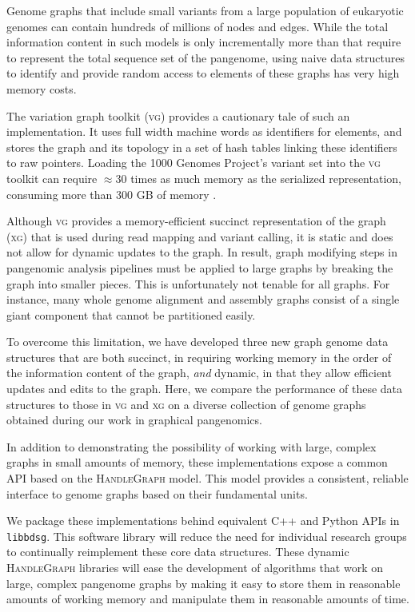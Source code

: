 \documentclass{article}
\begin{document}
Genome graphs that include small variants from a large population of eukaryotic genomes can contain hundreds of millions of nodes and edges.
While the total information content in such models is only incrementally more than that require to represent the total sequence set of the pangenome, using naive data structures to identify and provide random access to elements of these graphs has very high memory costs.

The variation graph toolkit (\textsc{vg}) \cite{Garrison_2018} provides a cautionary tale of such an implementation.
It uses full width machine words as identifiers for elements, and stores the graph and its topology in a set of hash tables linking these identifiers to raw pointers.
Loading the 1000 Genomes Project's variant set into the \textsc{vg} toolkit can require $\approx$30 times as much memory as the serialized representation, consuming more than 300 GB of memory \cite{Garrison_2019}.

Although \textsc{vg} provides a memory-efficient succinct representation of the graph (\textsc{xg}) that is used during read mapping and variant calling, it is static and does not allow for dynamic updates to the graph.
In result, graph modifying steps in pangenomic analysis pipelines must be applied to large graphs by breaking the graph into smaller pieces.
This is unfortunately not tenable for all graphs.
For instance, many whole genome alignment and assembly graphs consist of a single giant component that cannot be partitioned easily.

To overcome this limitation, we have developed three new graph genome data structures that are both succinct, in requiring working memory in the order of the information content of the graph, \emph{and} dynamic, in that they allow efficient updates and edits to the graph.
Here, we compare the performance of these data structures to those in \textsc{vg} and \textsc{xg} on a diverse collection of genome graphs obtained during our work in graphical pangenomics.

In addition to demonstrating the possibility of working with large, complex graphs in small amounts of memory, these implementations expose a common API based on the \textsc{HandleGraph} model.
This model provides a consistent, reliable interface to genome graphs based on their fundamental units.

We package these implementations behind equivalent C++ and Python APIs in \texttt{libbdsg}.
This software library will reduce the need for individual research groups to continually reimplement these core data structures.
These dynamic \textsc{HandleGraph} libraries will ease the development of algorithms that work on large, complex pangenome graphs by making it easy to store them in reasonable amounts of working memory and manipulate them in reasonable amounts of time.
\end{document}
